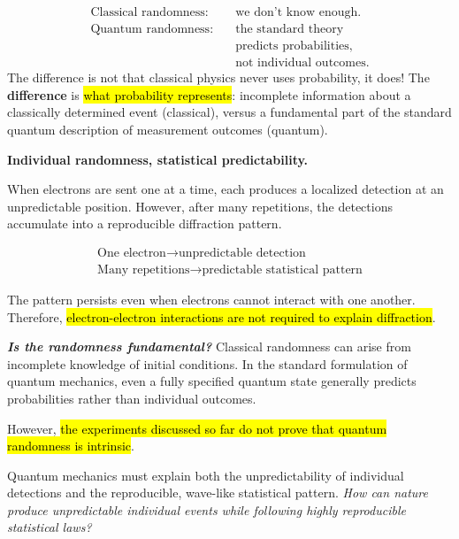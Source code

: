 \highspace
\begin{takeawaysbox}
    \begin{equation*}
        \begin{aligned}
            \text{Classical randomness:}&\quad \text{we don't know enough.}\\[4pt]
            \text{Quantum randomness:}&\quad \text{the standard theory}\\
            &\quad \text{predicts probabilities,}\\
            &\quad \text{not individual outcomes.}
        \end{aligned}
    \end{equation*}
    The difference is not that classical physics never uses probability, it does! The \textbf{difference} is \hl{what probability represents}: incomplete information about a classically determined event (classical), versus a fundamental part of the standard quantum description of measurement outcomes (quantum).
\end{takeawaysbox}

\newpage

\begin{takeawaysbox}
    \textbf{Individual randomness, statistical predictability.}

    When electrons are sent one at a time, each produces
    a localized detection at an unpredictable position.
    However, after many repetitions, the detections
    accumulate into a reproducible diffraction pattern.

    \begin{equation*}
        \begin{gathered}
            \text{One electron}
            \rightarrow
            \text{unpredictable detection}\\[4pt]
            \text{Many repetitions}
            \rightarrow
            \text{predictable statistical pattern}
        \end{gathered}
    \end{equation*}

    The pattern persists even when electrons cannot
    interact with one another. Therefore,
    \hl{electron-electron interactions are not
    required to explain diffraction}.

    \highspace
    \textbf{\emph{Is the randomness fundamental?}}
    Classical randomness can arise from incomplete
    knowledge of initial conditions. In the standard
    formulation of quantum mechanics, even a fully
    specified quantum state generally predicts
    probabilities rather than individual outcomes.

    However, \hl{the experiments discussed so far
    do not prove that quantum randomness is intrinsic}.

    \highspace
    Quantum mechanics must explain
    both the unpredictability of individual detections
    and the reproducible, wave-like statistical pattern.
    \emph{How can nature produce unpredictable individual events
    while following highly reproducible statistical laws?}
\end{takeawaysbox}

